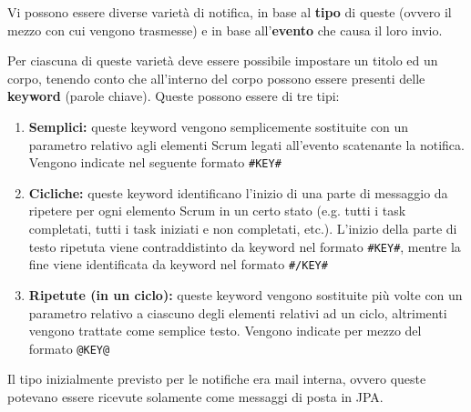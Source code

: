 Vi possono essere diverse varietà di notifica, in base al \textbf{tipo} di
queste (ovvero il mezzo con cui vengono trasmesse) e in base
all'\textbf{evento} che causa il loro invio.

Per ciascuna di queste varietà deve essere possibile impostare un titolo ed un
corpo, tenendo conto che all'interno del corpo possono essere presenti delle
\textbf{keyword} (parole chiave). Queste possono essere di tre tipi:

\begin{enumerate}
\item \textbf{Semplici:} queste keyword vengono semplicemente sostituite con un
  parametro relativo agli elementi Scrum legati all'evento scatenante la
  notifica. Vengono indicate nel seguente formato \texttt{\#KEY\#}
\item \textbf{Cicliche:} queste keyword identificano l'inizio di una parte di
  messaggio da ripetere per ogni elemento Scrum in un certo stato (e.g. tutti
  i task completati, tutti i task iniziati e non completati, etc.). L'inizio
  della parte di testo ripetuta viene contraddistinto da keyword nel formato
  \texttt{\#KEY\#}, mentre la fine viene identificata da keyword nel formato
  \texttt{\#/KEY\#}
\item \textbf{Ripetute (in un ciclo):} queste keyword vengono sostituite più
  volte con un parametro relativo a ciascuno degli elementi relativi ad un
  ciclo, altrimenti vengono trattate come semplice testo. Vengono indicate per
  mezzo del formato \texttt{@KEY@}
\end{enumerate}

Il tipo inizialmente previsto per le notifiche era mail interna, ovvero queste
potevano essere ricevute solamente come messaggi di posta in JPA.


